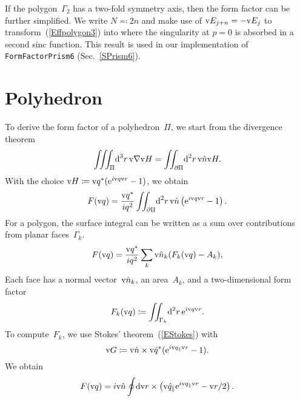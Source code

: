 If the polygon~$\Gamma_2$ has a two-fold symmetry axis,
then the form factor can be further simplified.
We write $N\eqqcolon2n$
and make use of $\text{v}{E}_{j+n}=-\text{v}{E}_j$ to transform~(\ref{Effpolygon3}) into
where the singularity at $p=0$ is absorbed in a second sinc function.
This result is used in our implementation of \texttt{FormFactorPrism6}
(Sec.~\ref{SPrism6}).
%


%
%

\section{Polyhedron}\label{SFFPolyhedron}

To derive the form factor of a polyhedron~$\Pi$,
we start from the divergence theorem
\begin{equation}
  \iiint_\Pi\!\text{d}^3r\,\text{v}{\nabla}\text{v}{H} = \iint_{\partial\Pi}\!\text{d}^2r\, \text{v}{\hat n}\text{v}{H}.
\end{equation}
With the choice $\text{v}{H}\coloneqq\text{v}{q}^*(\text{e}^{i\text{v}{q}\text{v}{r}}-1)$,
we obtain
\begin{equation}
  F(\text{v}{q}) = \frac{\text{v}{q}^*}{iq^2} \iint_{\partial\Pi}\!\text{d}^2r\, \text{v}{\hat n} \left(\text{e}^{i\text{v}{q}\text{v}{r}}-1\right).
\end{equation}
For a polygon, the surface integral can be written
as a sum over contributions from planar faces~$\Gamma_k$.
\begin{equation}
  F(\text{v}{q}) = \frac{\text{v}{q}^*}{iq^2} \sum_k \text{v}{\hat n}_k (F_k(\text{v}{q})-A_k),
\end{equation}
Each face has a normal vector~$\text{v}{\hat n}_k$, an area~$A_k$,
and a two-dimensional form factor
\begin{equation}
  F_k(\text{v}{q}) \coloneqq \iint_{\Gamma_k}\!\text{d}^2r\, \text{e}^{i\text{v}{q}\text{v}{r}}.
\end{equation}
To compute~$F_k$, we use Stokes' theorem~(\ref{EStokes}) with
\begin{equation}
  \text{v}{G}\coloneqq\text{v}{\hat n}\times\text{v}{\hat q}^*(\text{e}^{i\text{v}{q}_\parallel\text{v}{r}}-1).
\end{equation}
We obtain
\begin{equation}
  F(\text{v}{q})
  = i\text{v}{\hat n} \oint\!\text{d}\text{v}{r}\times\left( \text{v}{\hat q}_\parallel \text{e}^{i\text{v}{q}_\parallel\text{v}{r}} - \text{v}{r}/2 \right).
\end{equation}

